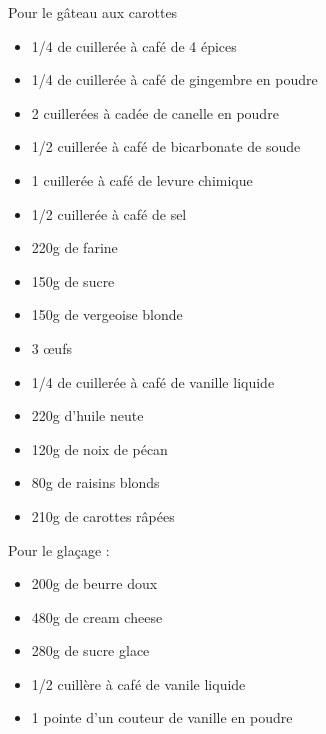\bigskip
{}
{}{Pour le gâteau aux carottes
\begin{itemize}
	\item 1/4 de cuillerée à café de 4 épices
	\item 1/4 de cuillerée à café de gingembre en poudre
	\item 2 cuillerées à cadée de canelle en poudre
	\item 1/2 cuillerée à café de bicarbonate de soude
	\item 1 cuillerée à café de levure chimique
	\item 1/2 cuillerée à café de sel
	\item 220g de farine
	\item 150g de sucre
	\item 150g de vergeoise blonde
	\item 3 \oe ufs
	\item 1/4 de cuillerée à café de vanille liquide
	\item 220g d'huile neute
	\item 120g de noix de pécan
	\item 80g de raisins blonds
	\item 210g de carottes râpées
\end{itemize}
Pour le glaçage :
\begin{itemize}
	\item 200g de beurre doux
	\item 480g de cream cheese
	\item 280g de sucre glace
	\item 1/2 cuillère à café de vanile liquide
	\item 1 pointe d'un couteur de vanille en poudre
\end{itemize}}
